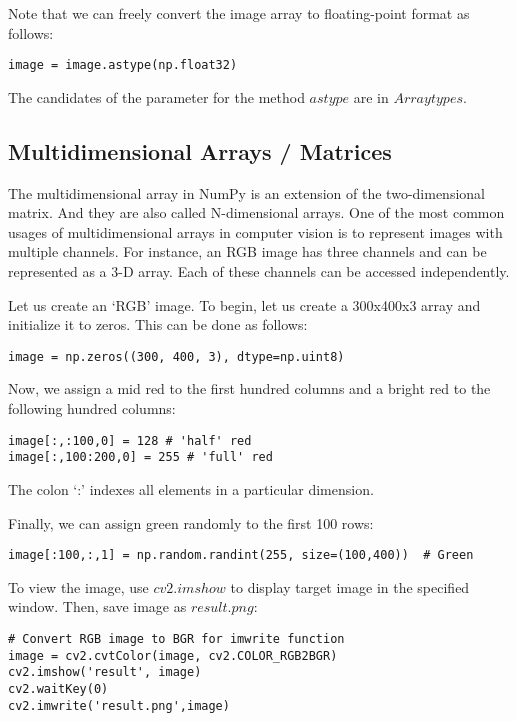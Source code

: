 \documentclass{article}
\begin{document}
Note that we can freely convert the image array to floating-point format as follows:
\begin{lstlisting}
image = image.astype(np.float32)
\end{lstlisting}

The candidates of the parameter for the method {$astype$} are in \href{https://numpy.org/doc/stable/user/basics.types.html}{$Array types$}.

\subsection{Multidimensional Arrays / Matrices}
The multidimensional array in NumPy is an extension of the two-dimensional matrix. And they are also called N-dimensional arrays. One of the most common usages of multidimensional arrays in computer vision is to represent images with multiple channels. For instance, an RGB image has three channels and can be represented as a 3-D array. Each of these channels can be accessed independently.

Let us create an `RGB' image. To begin, let us create a 300x400x3 array and initialize it to zeros. This can be done as follows:
\begin{lstlisting}
image = np.zeros((300, 400, 3), dtype=np.uint8)
\end{lstlisting}

Now, we assign a mid red to the first hundred columns and a bright red to the following hundred columns:
\begin{lstlisting}
image[:,:100,0] = 128 # 'half' red
image[:,100:200,0] = 255 # 'full' red
\end{lstlisting}

The colon `:' indexes all elements in a particular dimension.

Finally, we can assign green randomly to the first 100 rows:
\begin{lstlisting}
image[:100,:,1] = np.random.randint(255, size=(100,400))  # Green
\end{lstlisting}

To view the image, use {$cv2.imshow$} to display target image in the specified window. Then, save image as {$result.png$}:
\begin{lstlisting}
# Convert RGB image to BGR for imwrite function
image = cv2.cvtColor(image, cv2.COLOR_RGB2BGR)
cv2.imshow('result', image)
cv2.waitKey(0) 
cv2.imwrite('result.png',image)
\end{lstlisting}
\end{document}
